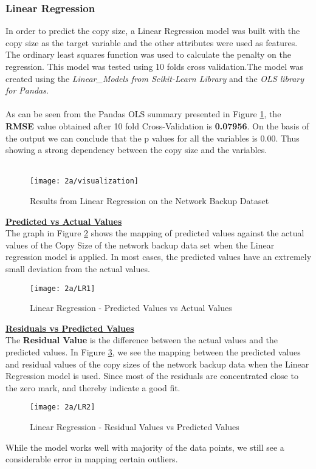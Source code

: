 \documentclass[letterpaper,twocolumn,10pt]{article}
\begin{document}
\subsubsection{Linear Regression}
In order to predict the copy size, a Linear Regression model was built with the copy size as the target variable and the other attributes were used as features. The ordinary least squares function was used to calculate the penalty on the regression. This model was tested using 10 folds cross validation.The model was created using the \emph{Linear\_Models from Scikit-Learn Library} and the \emph{OLS library for Pandas}.\\\\
As can be seen from the Pandas OLS summary presented in Figure \ref{fig:Visualization}, the \textbf{RMSE} value obtained after 10 fold Cross-Validation is \textbf{0.07956}. On the basis of the output we can conclude that the p values for all the variables is 0.00. Thus showing a strong dependency between the copy size and the variables.\\\\
\begin{figure}[H]
  \texttt{[image: 2a/visualization]}
  \caption{Results from Linear Regression on the Network Backup Dataset}
  \label{fig:Visualization}
\end{figure}
\textbf{\underline{Predicted vs Actual Values}}\\
The graph in Figure \ref{fig:LRPA} shows the mapping of predicted values against the actual values of the Copy Size of the network backup data set when the Linear regression model is applied. In most cases, the predicted values have an extremely small deviation from the actual values.
\begin{figure}[H]
  \texttt{[image: 2a/LR1]}
  \caption{Linear Regression - Predicted Values vs Actual Values}
  \label{fig:LRPA}
\end{figure}
\textbf{\underline{Residuals vs Predicted Values}}\\
The \textbf{Residual Value} is the difference between the actual values and the predicted values. In Figure \ref{fig:LRRA}, we see the mapping between the predicted values and residual values of the copy sizes of the network backup data when the Linear Regression model is used. Since most of the residuals are concentrated close to the zero mark, and thereby indicate a good fit.
\begin{figure}
  \texttt{[image: 2a/LR2]}
  \caption{Linear Regression - Residual Values vs Predicted Values}
  \label{fig:LRRA}
\end{figure}
While the model works well with majority of the data points, we still see a considerable error in mapping certain outliers. \\
\end{document}
